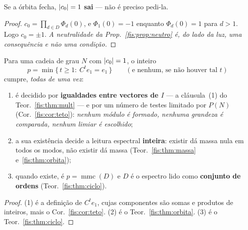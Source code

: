 \documentclass[livro.tex]{subfiles}
\begin{document}
\begin{corolario}\label{fis:cor:unidade}
Se a órbita fecha, $\lvert c_0\rvert=1$ \textbf{sai} --- não é preciso pedi-la.
\end{corolario}

\begin{proof}
$c_0=\prod_{d\in D}\Phi_d(0)$, e $\Phi_1(0)=-1$ enquanto $\Phi_d(0)=1$ para
$d>1$. Logo $c_0=\pm1$. \emph{A neutralidade da Prop.~\ref{fis:prop:neutro} é, do
lado da luz, uma consequência e não uma condição.}
\end{proof}

\begin{corolario}\label{fis:cor:nasce}
Para uma cadeia de grau $N$ com $\lvert c_0\rvert=1$, o inteiro
\[
p=\min\{\,t\ge1:\ C^{t}e_1=e_1\,\}\qquad(\text{e nenhum, se não houver tal }t)
\]
cumpre, \emph{todas de uma vez}:
\begin{enumerate}\itemsep3pt
\item[(1)] é decidido por \textbf{igualdades entre vectores de $I$} --- a
cláusula~(1) do Teor.~\ref{fis:thm:mult} --- e por um número de testes limitado
por $P(N)$ (Cor.~\ref{fis:cor:teto}): \emph{nenhum módulo é formado, nenhuma
grandeza é comparada, nenhum limiar é escolhido};
\item[(2)] a sua existência decide a leitura espectral \textbf{inteira}: existir
dá massa nula em todos os modos, não existir dá massa
(Teor.~\ref{fis:thm:massa} e~\ref{fis:thm:orbita});
\item[(3)] quando existe, é $p=\operatorname{mmc}(D)$ e $D$ é o espectro lido
como \textbf{conjunto de ordens} (Teor.~\ref{fis:thm:ciclo}).
\end{enumerate}
\end{corolario}

\begin{proof}
(1) é a definição de $C^{t}e_1$, cujas componentes são somas e produtos de
inteiros, mais o Cor.~\ref{fis:cor:teto}. (2) é o Teor.~\ref{fis:thm:orbita}.
(3) é o Teor.~\ref{fis:thm:ciclo}.
\end{proof}
\end{document}
